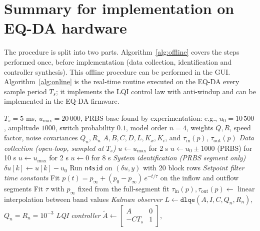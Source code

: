 \documentclass[12pt,a4paper]{article}
\begin{document}
\clearpage
\section{Summary for implementation on EQ-DA hardware}
The procedure is split into two parts. Algorithm~\ref{alg:offline} covers the steps performed once, before implementation (data collection, identification and controller synthesis). This offline procedure can be performed in the GUI. Algorithm~\ref{alg:online} is the real-time routine executed on the EQ-DA every sample period $T_s$; it implements the LQI control law with anti-windup and can be implemented in the EQ-DA firmware.
\renewcommand{\algorithmicrequire}{\textbf{Input:}}
\renewcommand{\algorithmicensure}{\textbf{Output:}}

\begin{algorithm}[ht]
\caption{Prior to implementation (offline) using open-loop identification}\label{alg:offline}
\begin{algorithmic}[1]
\Require $T_s = 5$ ms, $u_{\max} = 20\,000$, PRBS base found by experimentation: e.g., $u_0 = 10\,500$,
         amplitude $1000$, switch probability $0.1$, model order $n = 4$,
         weights $Q, R$, speed factor, noise covariances $Q_n, R_n$
\Ensure $A, B, C, D, L, K_x, K_i$, and $\tau_{\text{in}}(p)$, $\tau_{\text{out}}(p)$
  \Statex \textit{Data collection (open-loop, sampled at $T_s$)}
  \State $u \gets u_{\max}$ for 2 s 
  \State $u \gets u_0 \pm 1000$ (PRBS) for 10 s 
  \State $u \gets u_{\max}$ for 2 s 
  \State $u \gets 0$ for 8 s 
  \Statex \textit{System identification (PRBS segment only)}
  \State $\delta u[k] \gets u[k] - u_0$
  \State Run \texttt{n4sid} on $(\delta u, y)$ with 20 block rows
  \Statex \textit{Setpoint filter time constants}
  \State Fit $p(t) = p_\infty + (p_0 - p_\infty)\,e^{-t/\tau}$ on the inflow
         and outflow segments
    \State Fit $\tau$ with $p_\infty$ fixed from the full-segment fit
  \EndFor
  \State $\tau_{\text{in}}(p), \tau_{\text{out}}(p) \gets$ linear interpolation
         between band values
  \Statex \textit{Kalman observer}
  \State $L \gets \texttt{dlqe}(A, I, C, Q_n, R_n)$, \quad $Q_n = R_n = 10^{-3}$
  \Statex \textit{LQI controller}
  \State $\tilde{A} \gets \begin{bmatrix} A & 0 \\ -C T_s & 1 \end{bmatrix}$,

\end{algorithmic}
\end{algorithm}
\end{document}
